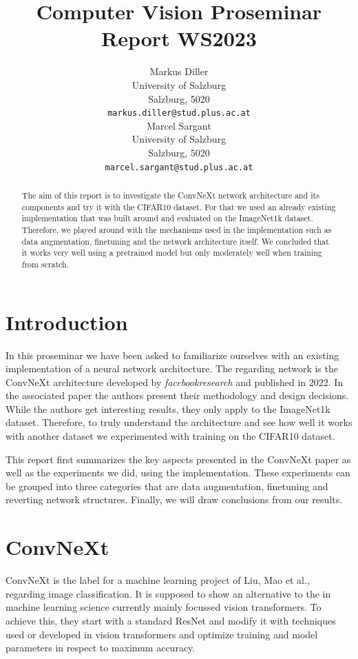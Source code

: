 \documentclass{article}
\title{Computer Vision Proseminar Report WS2023}
\author{%
    Markus Diller\\
    University of Salzburg\\
    Salzburg, 5020 \\
    \texttt{markus.diller@stud.plus.ac.at} \\
    \And
    Marcel Sargant \\
    University of Salzburg \\
    Salzburg, 5020 \\
    \texttt{marcel.sargant@stud.plus.ac.at} \\
}
\begin{document}
\maketitle


\begin{abstract}
    The aim of this report is to investigate the ConvNeXt network architecture and its components and try it with the CIFAR10 dataset.
    For that we used an already existing implementation that was built around and evaluated on the ImageNet1k dataset.
    Therefore, we played around with the mechanisms used in the implementation such as data augmentation, finetuning and the network architecture itself.
    We concluded that it works very well using a pretrained model but only moderately well when training from scratch.
\end{abstract}


\section{Introduction}\label{sec:introduction}
In this proseminar we have been asked to familiarize ourselves with an existing implementation of a neural network architecture.
The regarding network is the ConvNeXt architecture developed by \textit{facebookresearch} and published in 2022.
In the associated paper the authors present their methodology and design decisions.
While the authors get interesting results, they only apply to the ImageNet1k dataset.
Therefore, to truly understand the architecture and see how well it works with another dataset we experimented with training on the CIFAR10 dataset.

This report first summarizes the key aspects presented in the ConvNeXt paper as well as the experiments we did, using the implementation.
These experiments can be grouped into three categories that are data augmentation, finetuning and reverting network structures.
Finally, we will draw conclusions from our results.

\section{ConvNeXt}\label{sec:convnext}
ConvNeXt\cite{liu2022convnet} is the label for a machine learning project of Liu, Mao et al., regarding image classification.
It is supposed to show an alternative to the in machine learning science currently mainly focussed vision transformers.
To achieve this, they start with a standard ResNet and modify it with techniques used or developed in vision transformers and optimize training and model parameters in respect to maximum accuracy.
\end{document}
